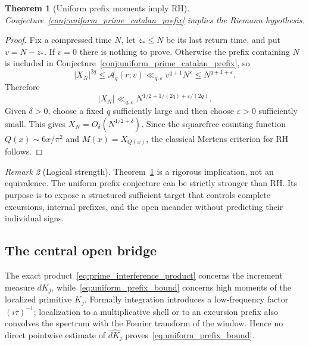 \documentclass[11pt]{amsart}
\numberwithin{equation}{section}
\theoremstyle{plain}
\newtheorem{theorem}{Theorem}[section]
\theoremstyle{definition}
\theoremstyle{remark}
\newtheorem{remark}[theorem]{Remark}
\newcommand{\Mert}{M}
\newcommand{\eps}{\varepsilon}
\begin{document}
\begin{theorem}[Uniform prefix moments imply RH]
\label{thm:uniform_prefix_implies_rh}
Conjecture~\ref{conj:uniform_prime_catalan_prefix} implies the Riemann
hypothesis.
\end{theorem}

\begin{proof}
Fix a compressed time $N$, let $z_\ast\leq N$ be its last return time, and put
$v=N-z_\ast$.  If $v=0$ there is nothing to prove.  Otherwise the prefix
containing $N$ is included in Conjecture~\ref{conj:uniform_prime_catalan_prefix},
so
\begin{equation}
|X_N|^{2q}\leq\mathcal A_q(r;v)
\ll_{q,\eps}v^{q+1}N^\eps
\leq N^{q+1+\eps}.
\end{equation}
Therefore
\begin{equation}
|X_N|\ll_{q,\eps}
N^{1/2+1/(2q)+\eps/(2q)}.
\end{equation}
Given $\delta>0$, choose a fixed $q$ sufficiently large and then choose
$\eps>0$ sufficiently small.  This gives
$X_N=O_\delta(N^{1/2+\delta})$.  Since the squarefree counting function
$Q(x)\sim6x/\pi^2$ and $\Mert(x)=X_{Q(x)}$, the classical Mertens criterion
for RH follows.
\end{proof}

\begin{remark}[Logical strength]
Theorem~\ref{thm:uniform_prefix_implies_rh} is a rigorous implication, not an
equivalence.  The uniform prefix conjecture can be strictly stronger than RH.
Its purpose is to expose a structured sufficient target that controls complete
excursions, internal prefixes, and the open meander without predicting their
individual signs.
\end{remark}

\subsection{The central open bridge}

The exact product~\eqref{eq:prime_interference_product} concerns the increment
measure $dK_j$, while~\eqref{eq:uniform_prefix_bound} concerns high moments of
the localized primitive $K_j$.  Formally integration introduces a low-frequency
factor $(i\tau)^{-1}$; localization to a multiplicative shell or to an
excursion prefix also convolves the spectrum with the Fourier transform of the
window.  Hence no direct pointwise estimate of
$\widehat{dK_j}$ proves~\eqref{eq:uniform_prefix_bound}.
\end{document}
